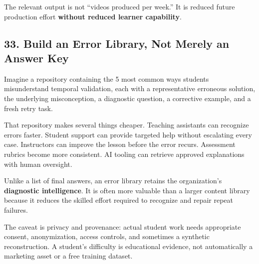 The relevant output is not ``videos produced per week.'' It is reduced future production effort \textbf{without reduced learner capability}.

\subsection*{33. Build an Error Library, Not Merely an Answer Key}

Imagine a repository containing the 5 most common ways students misunderstand temporal validation, each with a representative erroneous solution, the underlying misconception, a diagnostic question, a corrective example, and a fresh retry task.

That repository makes several things cheaper. Teaching assistants can recognize errors faster. Student support can provide targeted help without escalating every case. Instructors can improve the lesson before the error recurs. Assessment rubrics become more consistent. AI tooling can retrieve approved explanations with human oversight.

Unlike a list of final answers, an error library retains the organization's \textbf{diagnostic intelligence}. It is often more valuable than a larger content library because it reduces the skilled effort required to recognize and repair repeat failures.

The caveat is privacy and provenance: actual student work needs appropriate consent, anonymization, access controls, and sometimes a synthetic reconstruction. A student's difficulty is educational evidence, not automatically a marketing asset or a free training dataset.
